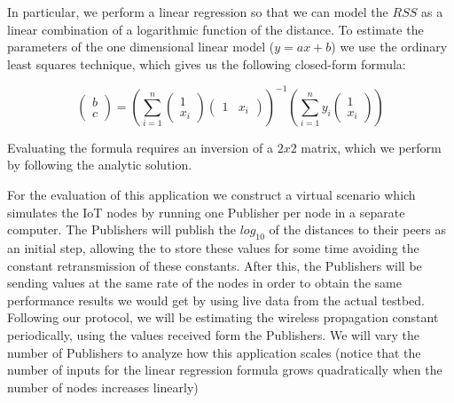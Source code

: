 In particular, we perform a linear regression so that we can model the $RSS$ as
a linear combination of a logarithmic function of the distance.  To estimate
the parameters of the one dimensional linear model ($y = ax + b$) we use the
ordinary least squares technique, which gives us the following closed-form
formula:

\[
\begin{pmatrix} b \\ c \end{pmatrix} =
\left( \displaystyle\sum_{i=1}^n \begin{pmatrix} 1 \\ x_i \end{pmatrix}
  \begin{pmatrix} 1 & x_i\end{pmatrix}\right)^{-1}
\left( \displaystyle\sum_{i=1}^n y_i \begin{pmatrix} 1 \\ x_i \end{pmatrix}\right)
\]

Evaluating the formula requires an inversion of a $2 x 2$ matrix, which we perform
by following the analytic solution.

For the evaluation of this application we construct a virtual scenario which
simulates the IoT nodes by running one Publisher per node in a separate
computer.  The Publishers will publish the $log_{10}$ of the distances to their
peers as an initial step, allowing the \broker to store these values for some
time avoiding the constant retransmission of these constants.  After this, the
Publishers will be sending values at the same rate of the nodes in order to
obtain the same performance results we would get by using live data from the
actual testbed.  Following our protocol, we will be estimating the wireless
propagation constant periodically, using the values received form the
Publishers.  We will vary the number of Publishers to analyze how this
application scales (notice that the number of inputs for the linear regression
formula grows quadratically when the number of nodes increases linearly)

